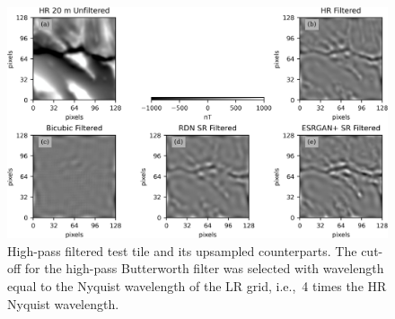     \begin{figure}[hbtp]
        \centering
        \includegraphics[width=\linewidth,trim={0 0 0 -5mm},clip]{fig/p1/hpfilt.jpg}
        \caption[High-pass filtered results]{High-pass filtered test tile and its upsampled counterparts.
            The cut-off for the high-pass Butterworth filter was selected with wavelength equal to the Nyquist wavelength of the LR grid, i.e.,\ 4 times the HR Nyquist wavelength.
        }
        \label{fig:filtered}
    \end{figure}

